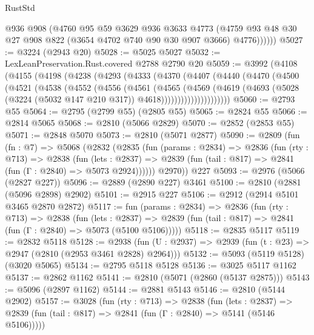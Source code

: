 \begin{lexlean}{RustStd}
\begin{coremodule}
            @936
            @908
            (@4760
              @95
              @59
              @3629
              @936
              @3633
              @4773
              (@4759 @93 @48 @30 @27 @908 @822 (@3654 @4702 @740 @90 @30 @907 @3666) @4776))))))
@5027 := @3224 (@2943 @20)
@5028 := @5025 @5027
@5032 := LexLeanPreservation.Rust.covered @2788 @2790 @20
@5059 := @3992
    (@4108
      (@4155
        (@4198
          (@4238
            (@4293
              (@4333
                (@4370
                  (@4407
                    (@4440
                      (@4470
                        (@4500
                          (@4521
                            (@4538
                              (@4552
                                (@4556
                                  (@4561
                                    (@4565
                                      (@4569
                                        (@4619
                                          (@4693
                                            (@5028
                                              (@3224 (@5032 @147 @210 @317))
                                              @4618)))))))))))))))))))))
@5060 := @2793 @55
@5064 := @2795 (@2799 @55) (@2805 @55)
@5065 := @2824 @55
@5066 := @2814 @5065
@5068 := @2810 (@5066 @2829)
@5070 := @2852 (@2853 @55)
@5071 := @2848 @5070
@5073 := @2810 (@5071 @2877)
@5090 := @2809
    (fun (fn : @7) =>
    @5068
      (@2832
        (@2835
          (fun (params : @2834) =>
          @2836
            (fun (rty : @713) =>
            @2838
              (fun (lets : @2837) =>
              @2839 (fun (tail : @817) => @2841 (fun (Γ : @2840) => @5073 @2924))))))
        @2970))
    @227
@5093 := @2976 (@5066 (@2827 @227))
@5096 := @2889 (@2890 @227) @3461
@5100 := @2810 (@2881 (@5096 @2898) @2902)
@5101 := @2915 @227
@5106 := @2912 (@2914 @5101 @3465 @2870 @2872)
@5117 := fun (params : @2834) =>
  @2836
    (fun (rty : @713) =>
    @2838
      (fun (lets : @2837) =>
      @2839 (fun (tail : @817) => @2841 (fun (Γ : @2840) => @5073 (@5100 @5106)))))
@5118 := @2835 @5117
@5119 := @2832 @5118
@5128 := @2938 (fun (U : @2937) => @2939 (fun (t : @23) => @2947 (@2810 (@2953 @3461 @2828) @2964)))
@5132 := @5093 (@5119 @5128) (@3020 @5065)
@5134 := @2795 @5118 @5128
@5136 := @3025 @5117 @1162
@5137 := @2862 @1162
@5141 := @2810 (@5071 (@2860 (@5137 @2875)))
@5143 := @5096 (@2897 @1162)
@5144 := @2881 @5143
@5146 := @2810 (@5144 @2902)
@5157 := @3028
    (fun (rty : @713) =>
    @2838
      (fun (lets : @2837) =>
      @2839 (fun (tail : @817) => @2841 (fun (Γ : @2840) => @5141 (@5146 @5106)))))

\end{coremodule}
\end{lexlean}
